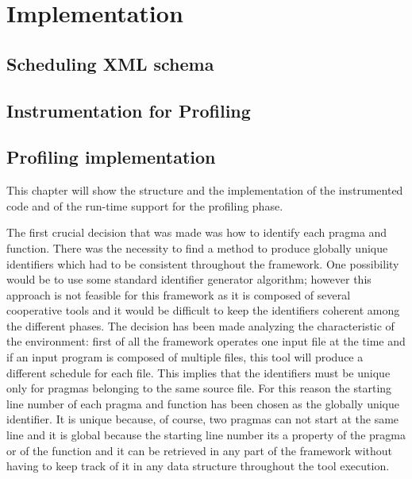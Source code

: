 \documentclass[a4paper,11pt,oneside]{book}
\begin{document}
 


\chapter{Implementation}
\section{Scheduling XML schema}
\section{Instrumentation for Profiling}


\section{Profiling implementation}
This chapter will show the structure and the implementation of the instrumented code and of the run-time support for the profiling phase.

The first crucial decision that was made was how to identify each pragma and function. There was the necessity to find a method to produce globally unique identifiers which had to be consistent throughout the framework. One possibility would be to use some standard identifier generator algorithm; however this approach is not feasible for this framework as it is composed of several cooperative tools and it would be difficult to keep the identifiers coherent among the different phases. The decision has been made analyzing the characteristic of the environment: first of all the framework operates one input file at the time and if an input program is composed of multiple files, this tool will produce a different schedule for each file. This implies that the identifiers must be unique only for pragmas belonging to the same source file. For this reason the starting line number of each pragma and function has been chosen as the globally unique identifier. It is unique because, of course, two pragmas can not start at the same line and it is global because the starting line number its a property of the pragma or of the function and it can be retrieved in any part of the framework without having to keep track of it in any data structure throughout the tool execution.
\end{document}
